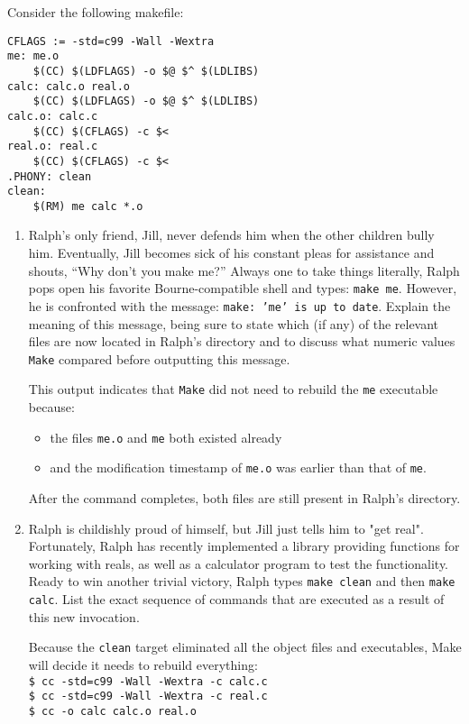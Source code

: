 Consider the following makefile:
\begin{lstlisting}
CFLAGS := -std=c99 -Wall -Wextra
me: me.o
    $(CC) $(LDFLAGS) -o $@ $^ $(LDLIBS)
calc: calc.o real.o
	$(CC) $(LDFLAGS) -o $@ $^ $(LDLIBS)
calc.o: calc.c
	$(CC) $(CFLAGS) -c $<
real.o: real.c
	$(CC) $(CFLAGS) -c $<
.PHONY: clean
clean:
	$(RM) me calc *.o
\end{lstlisting}

\begin{enumerate}
\item
Ralph's only friend, Jill, never defends him when the other children bully him.
Eventually, Jill becomes sick of his constant pleas for assistance and shouts, ``Why don't you make me?''
Always one to take things literally, Ralph pops open his favorite Bourne-compatible shell and types: \texttt{make me}.
However, he is confronted with the message: \texttt{make:\ 'me' is up to date}.
Explain the meaning of this message, being sure to state which (if any) of the relevant files are now located in Ralph's directory and to discuss what numeric values \texttt{Make} compared before outputting this message.

\begin{answer}
This output indicates that \texttt{Make} did not need to rebuild the \texttt{me} executable because:
\begin{itemize}
	\item the files \texttt{me.o} and \texttt{me} both existed already
	\item and the modification timestamp of \texttt{me.o} was earlier than that of \texttt{me}.
\end{itemize}
After the command completes, both files are still present in Ralph's directory.
\end{answer}

\item
Ralph is childishly proud of himself, but Jill just tells him to "get real".
Fortunately, Ralph has recently implemented a library providing functions for working with reals, as well as a calculator program to test the functionality.
Ready to win another trivial victory, Ralph types \texttt{make clean} and then \texttt{make calc}.
List the exact sequence of commands that are executed as a result of this new invocation.

\begin{answer}
Because the \texttt{clean} target eliminated all the object files and executables, Make will decide it needs to rebuild everything: \\
\texttt{\$ cc -std=c99 -Wall -Wextra -c calc.c} \\
\texttt{\$ cc -std=c99 -Wall -Wextra -c real.c} \\
\texttt{\$ cc -o calc calc.o real.o}
\end{answer}
\end{enumerate}

